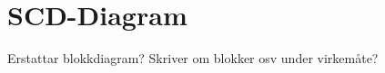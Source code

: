 \section{SCD-Diagram}
\thispagestyle{fancy}

Erstattar blokkdiagram? Skriver om blokker osv under virkemåte?